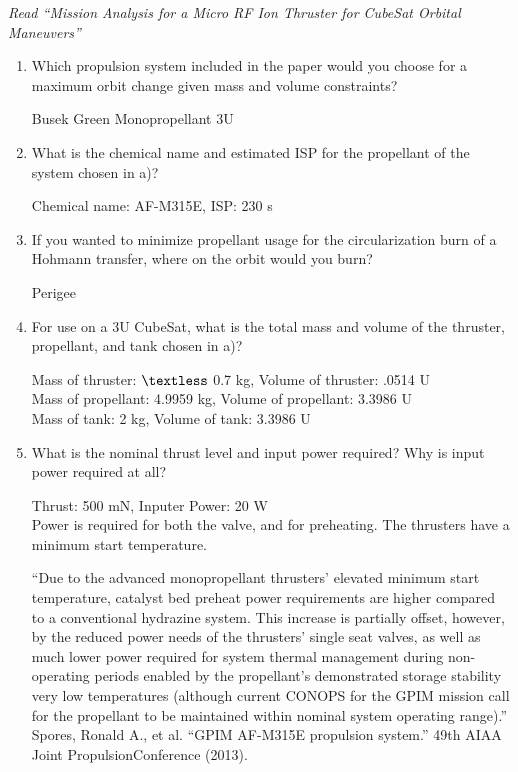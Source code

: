 \documentclass[onecolumn,10pt]{jhwhw}
\begin{document}
\problem{}
\textit{Read ``Mission Analysis for a Micro RF Ion Thruster for CubeSat Orbital Maneuvers''}
\begin{enumerate}
\item Which propulsion system included in the paper would you choose for a maximum orbit change given mass and volume constraints?

Busek Green Monopropellant 3U

\item What is the chemical name and estimated ISP for the propellant of the system chosen in a)?

Chemical name: AF-M315E, ISP: 230 s

\item If you wanted to minimize propellant usage for the circularization burn of a Hohmann transfer, where on the orbit would you burn?

Perigee

\item For use on a 3U CubeSat, what is the total mass and volume of the thruster, propellant, and tank chosen in a)?

Mass of thruster: $\textless$ 0.7 kg, Volume of thruster: .0514 U \\
Mass of propellant: 4.9959 kg, Volume of propellant: 3.3986 U \\
Mass of tank: 2 kg, Volume of tank: 3.3986 U

\item What is the nominal thrust level and input power required? Why is input power required at all?

Thrust: 500 mN, Inputer Power: 20 W \\
Power is required for both the valve, and for preheating. The thrusters have a minimum start temperature.

``Due to the advanced monopropellant thrusters’ elevated minimum start temperature, catalyst bed preheat power requirements are higher compared to a conventional hydrazine system. This increase is partially offset, however, by the reduced power needs of the thrusters’ single seat valves, as well as much lower power required for system thermal management during non-operating periods enabled by the propellant’s demonstrated storage stability very low temperatures (although current CONOPS for the GPIM mission call for the propellant to be maintained within nominal system operating range).'' Spores, Ronald A., et al. ``GPIM AF-M315E propulsion system.'' 49th AIAA Joint PropulsionConference (2013).


\end{enumerate}
\end{document}
